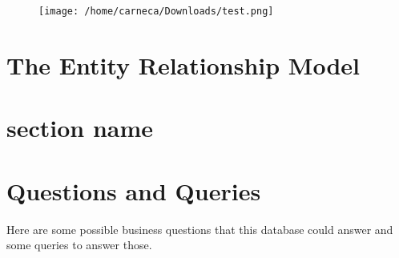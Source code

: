 \documentclass{article}
\title{}
\author{}
\date{}
\theoremstyle{definition}
\theoremstyle{exercise}
\theoremstyle{remark}
\begin{document}
\maketitle
\noindent

\begin{figure}[htpb]
    \centering
    {\texttt{[image: /home/carneca/Downloads/test.png]}}
    \caption{}
    \label{}
\end{figure}
\section*{The Entity Relationship Model}%
\section*{section name}%
\section*{Questions and Queries}%
Here are some possible business questions that this database could answer and some queries to answer those.



%
\end{document}
